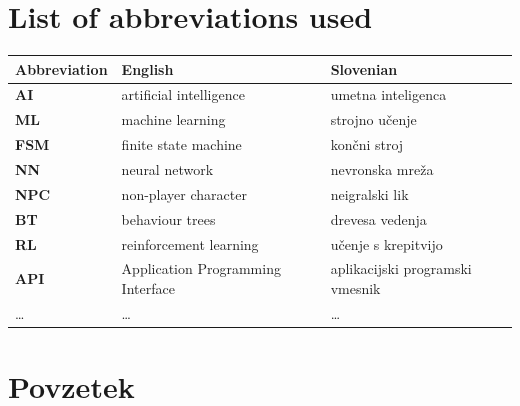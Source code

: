 \documentclass[a4paper, 12pt]{book}
\newcommand{\clearemptydoublepage}{\newpage{\pagestyle{empty}\cleardoublepage}}
\begin{document}
\chapter*{List of abbreviations used}  %

\noindent\begin{tabular}{p{}|p{}|p{}}    %
  {\bf Abbreviation} & {\bf English} & {\bf Slovenian} \\ \hline
  {\bf AI}      & artificial intelligence           & umetna inteligenca \\
  {\bf ML}      & machine learning                  & strojno učenje \\
  {\bf FSM}     & finite state machine              & končni stroj \\
  {\bf NN}      & neural network                    & nevronska mreža \\
  {\bf NPC}     & non-player character              & neigralski lik \\
  {\bf BT }     & behaviour trees                   & drevesa vedenja \\
  {\bf RL }     & reinforcement learning            & učenje s krepitvijo \\
  
  {\bf API }    & Application Programming Interface & aplikacijski programski vmesnik \\
  
  \dots         & \dots                             & \dots \\
\end{tabular}

\clearemptydoublepage


\chapter*{Povzetek}
\end{document}

